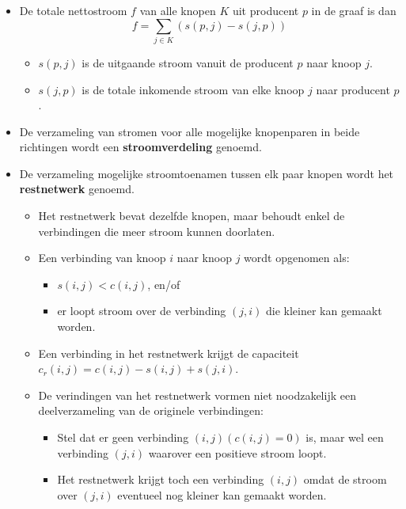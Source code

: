\begin{itemize}
\begin{itemize}
    \end{itemize}
    \item De totale nettostroom $f$ van alle knopen $K$ uit producent $p$ in de graaf is dan 
    $$f = \sum_{j \in K} (s(p, j) - s(j, p))$$ 
    \begin{itemize}
        \item $s(p, j)$ is de uitgaande stroom vanuit de producent $p$ naar knoop $j$.
        \item $s(j, p)$ is de totale inkomende stroom van elke knoop $j$ naar producent $p$.
    \end{itemize}
    \item De verzameling van stromen voor alle mogelijke knopenparen in beide richtingen wordt een \textbf{stroomverdeling} genoemd.
    \item De verzameling mogelijke stroomtoenamen tussen elk paar knopen wordt het \textbf{restnetwerk} genoemd.
    \begin{itemize}
        \item Het restnetwerk bevat dezelfde knopen, maar behoudt enkel de verbindingen die meer stroom kunnen doorlaten.
        \item Een verbinding van knoop $i$ naar knoop $j$ wordt opgenomen als:
        \begin{itemize}
            \item  $s(i, j) < c(i, j)$, en/of
            \item  er loopt stroom over de verbinding $(j, i)$ die kleiner kan gemaakt worden.
        \end{itemize}
        \item Een verbinding in het restnetwerk krijgt de capaciteit $c_r(i, j) = c(i, j) - s(i, j) + s(j, i)$.
        \item De verindingen van het restnetwerk vormen niet noodzakelijk een deelverzameling van de originele verbindingen:
        \begin{itemize}
            \item Stel dat er geen verbinding $(i, j) (c(i, j) = 0)$ is, maar wel een verbinding $(j, i)$ waarover een positieve stroom loopt.
            \item Het restnetwerk krijgt toch een verbinding $(i, j)$ omdat de stroom over $(j, i)$ eventueel nog kleiner kan gemaakt worden.
        \end{itemize}
        

\end{itemize}
\end{itemize}
